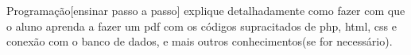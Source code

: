 {Programação}[ensinar passo a passo] explique detalhadamente como fazer com que o aluno aprenda a fazer um pdf com os códigos supracitados de php, html, css e conexão com o banco de dados, e mais outros conhecimentos(se for necessário).